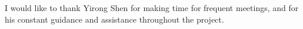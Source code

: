 I would like to thank Yirong Shen for making time for frequent meetings, and for his constant guidance and assistance throughout the project.
